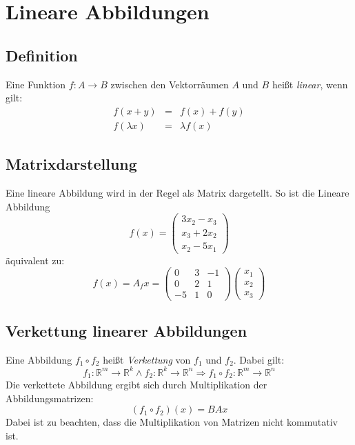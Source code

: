 
\section{Lineare Abbildungen}
\label{sec:lineare_abbildungen}

\subsection{Definition}
\label{sub:definition-lin-abb}

Eine Funktion $f : A \to B$ zwischen den Vektorräumen $A$ und $B$ heißt \emph{linear}, wenn gilt:
\begin{eqnarray}
	f(x+y) &=& f(x) + f(y) \\
	f(\lambda x) &=& \lambda f(x)
\end{eqnarray}

\subsection{Matrixdarstellung}
\label{sub:matrixdarstellung}

Eine lineare Abbildung wird in der Regel als Matrix dargetellt. So ist die Lineare Abbildung
\begin{displaymath}
	f(x) = \left(\begin{matrix}3x_2 - x_3\\x_3 + 2x_2\\x_2 - 5x_1\end{matrix}\right)
\end{displaymath}
äquivalent zu: 
\begin{displaymath}
	f(x) = A_fx = \left(\begin{matrix}0 & 3 & -1 \\ 0 & 2 & 1 \\ -5 & 1 & 0\end{matrix}\right) 
	\left(\begin{matrix}x_1\\x_2\\x_3\end{matrix}\right)
\end{displaymath}

\subsection{Verkettung linearer Abbildungen}
\label{sub:verkettung_linearer_abbildungen}

Eine Abbildung $f_1 \circ f_2$ heißt \emph{Verkettung} von $f_1$ und $f_2$. Dabei gilt:
\begin{equation}
	f_1: \mathbb{R}^m \to \mathbb{R}^k    \wedge    f_2: \mathbb{R}^k \to \mathbb{R}^n
	\Rightarrow f_1 \circ f_2 : \mathbb{R}^m \to \mathbb{R}^n
\end{equation}
Die verkettete Abbildung ergibt sich durch Multiplikation der Abbildungsmatrizen: 
\begin{equation}
	(f_1 \circ f_2)(x) = BAx
\end{equation}
Dabei ist zu beachten, dass die Multiplikation von Matrizen nicht kommutativ ist.

